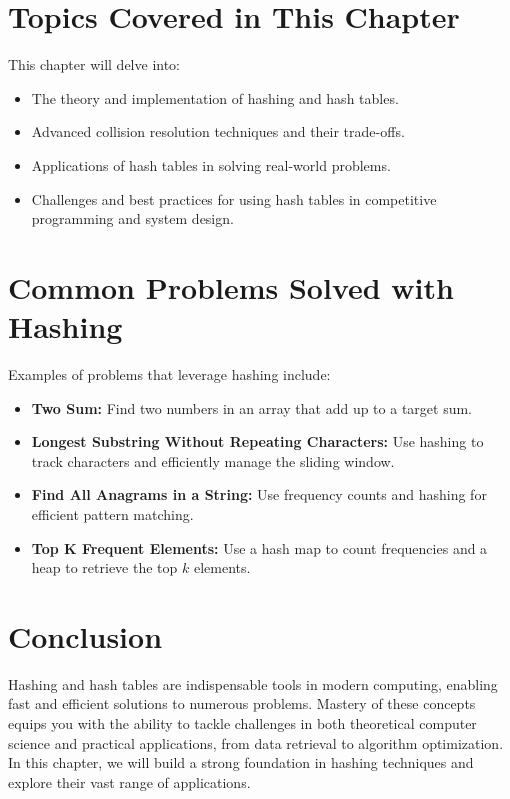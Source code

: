 \section*{Topics Covered in This Chapter}
This chapter will delve into:
\begin{itemize}
    \item The theory and implementation of hashing and hash tables.
    \item Advanced collision resolution techniques and their trade-offs.
    \item Applications of hash tables in solving real-world problems.
    \item Challenges and best practices for using hash tables in competitive programming and system design.
\end{itemize}

\section*{Common Problems Solved with Hashing}
Examples of problems that leverage hashing include:
\begin{itemize}
    \item \textbf{Two Sum:} Find two numbers in an array that add up to a target sum.
    \item \textbf{Longest Substring Without Repeating Characters:} Use hashing to track characters and efficiently manage the sliding window.
    \item \textbf{Find All Anagrams in a String:} Use frequency counts and hashing for efficient pattern matching.
    \item \textbf{Top K Frequent Elements:} Use a hash map to count frequencies and a heap to retrieve the top \(k\) elements.
\end{itemize}

\section*{Conclusion}
Hashing and hash tables are indispensable tools in modern computing, enabling fast and efficient solutions to numerous problems. Mastery of these concepts equips you with the ability to tackle challenges in both theoretical computer science and practical applications, from data retrieval to algorithm optimization. In this chapter, we will build a strong foundation in hashing techniques and explore their vast range of applications.